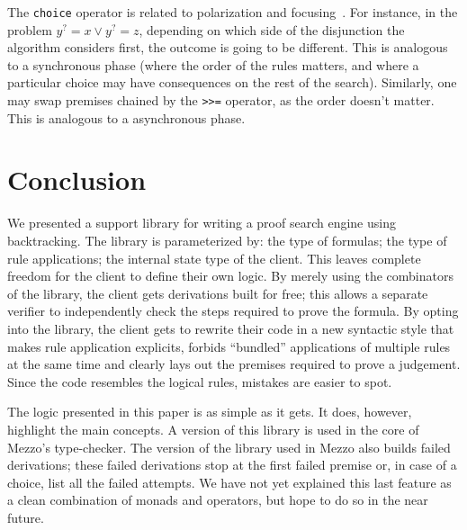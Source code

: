 \documentclass{easychair}
\def\li{\lstinline}
\newcommand{\f}[1]{\ensuremath{#1^?}} %
\begin{document}
The \li+choice+ operator is related to polarization and
focusing~\cite{liang-miller-07}. For instance, in the problem $\f y = x \vee \f
y = z$, depending on which side of the disjunction the algorithm considers first,
the outcome is going to be different. This is analogous to a synchronous phase
(where the order of the rules matters, and where a particular choice may have
consequences on the rest of the search). Similarly, one may swap premises
chained by the \li+>>=+ operator, as the order doesn't matter. This is analogous
to a asynchronous phase.

\section{Conclusion}

We presented a support library for writing a proof search engine using
backtracking. The library is parameterized by: the type of formulas; the type of
rule applications; the internal state type of the client. This leaves complete
freedom for the client to define their own logic. By merely using the
combinators of the library, the client gets derivations built for free; this allows
a separate verifier to independently check the steps required to prove the
formula. By opting into the library, the client gets to rewrite their code in a
new syntactic style that makes rule application explicits, forbids ``bundled''
applications of multiple rules at the same time and clearly lays out the
premises required to prove a judgement. Since the code resembles the logical
rules, mistakes are easier to spot.

The logic presented in this paper is as simple as it gets. It does, however,
highlight the main concepts. A version of this library is used in the core of
Mezzo's type-checker. The version of the library used in Mezzo also builds
failed derivations; these failed derivations stop at the first failed premise
or, in case of a choice, list all the failed attempts. We have not yet explained
this last feature as a clean combination of monads and operators, but hope to do
so in the near future.



\end{document}
